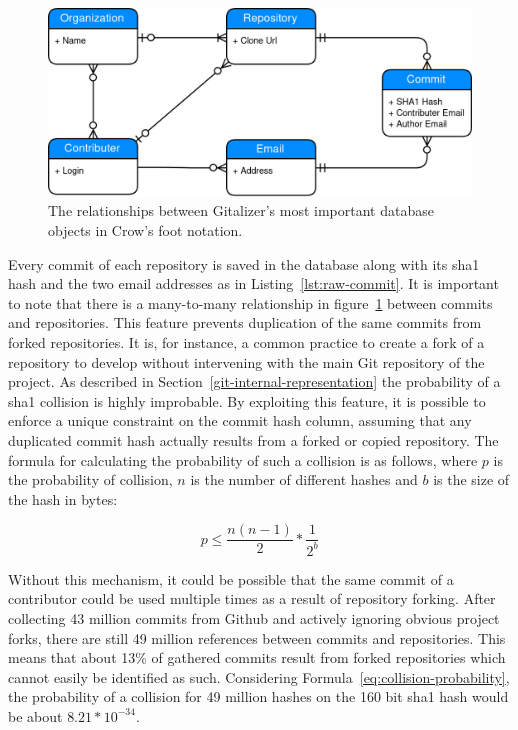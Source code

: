 \begin{figure}[H]
\includegraphics[scale=0.3]{./graphs/gitalizer-data-structure}
\centering
\caption{The relationships between Gitalizer's most important database objects in Crow's foot notation.}\label{fig:gitalizer-relationship}
\end{figure}

Every commit of each repository is saved in the database along with its \ac{sha1} hash and the two email addresses as in Listing~\ref{lst:raw-commit}.
It is important to note that there is a many-to-many relationship in figure~\ref{fig:gitalizer-relationship} between commits and repositories.
This feature prevents duplication of the same commits from forked repositories.
It is, for instance, a common practice to create a fork of a repository to develop without intervening with the main Git repository of the project.
As described in Section~\ref{git-internal-representation} the probability of a \ac{sha1} collision is highly improbable.
By exploiting this feature, it is possible to enforce a unique constraint on the commit hash column, assuming that any duplicated commit hash actually results from a forked or copied repository.
The formula for calculating the probability of such a collision is as follows, where $p$ is the probability of collision, $n$ is the number of different hashes and $b$ is the size of the hash in bytes:

\begin{equation}\label{eq:collision-probability}
    p \leq \frac{n(n-1)}{2} * \frac{1}{2^{b}}
\end{equation}

Without this mechanism, it could be possible that the same commit of a contributor could be used multiple times as a result of repository forking.
After collecting 43 million commits from Github and actively ignoring obvious project forks, there are still 49 million references between commits and repositories.
This means that about 13\% of gathered commits result from forked repositories which cannot easily be identified as such.
Considering Formula~\ref{eq:collision-probability}, the probability of a collision for 49 million hashes on the 160 bit \ac{sha1} hash would be about $8.21 * 10^{-34}$.

